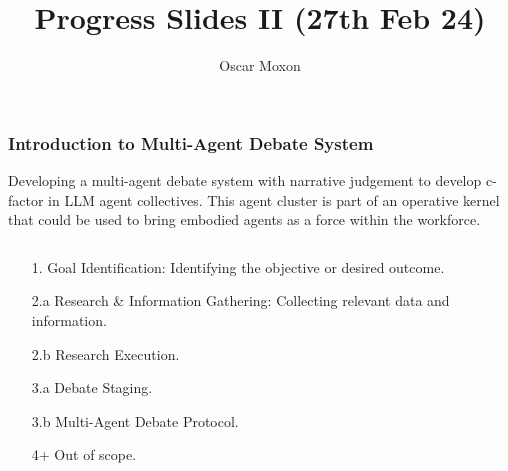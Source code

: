 \documentclass{beamer}
\title{Progress Slides II (27th Feb 24)}
\author{Oscar Moxon}
\institute{King's College London}
\begin{document}
\begin{frame}
\titlepage
\end{frame}

\logo{}
\begin{frame}
\frametitle{Introduction to Multi-Agent Debate System}
\vspace{-0.3cm} %
\begin{center}
Developing a multi-agent debate system with narrative judgement to develop c-factor in LLM agent collectives. 
This agent cluster is part of an operative kernel that could be used to bring embodied agents as a force within the workforce.
\end{center}

\begin{columns}[T] %

    \begin{column}{0.5\textwidth}
            \begin{itemize}

            \item[1.] Goal Identification: Identifying the objective or desired outcome.
            \item[2.a] Research \& Information Gathering: Collecting relevant data and information.
            \item[2.b] Research Execution.
            \item[3.a] Debate Staging.
            \item[3.b] Multi-Agent Debate Protocol.
            \item[4+] Out of scope.
        
            \end{itemize}

    \end{column}
    
    \begin{column}{0.5\textwidth}
    \vspace{-0.6cm} %


\end{column}
\end{columns}
\end{frame}
\end{document}
